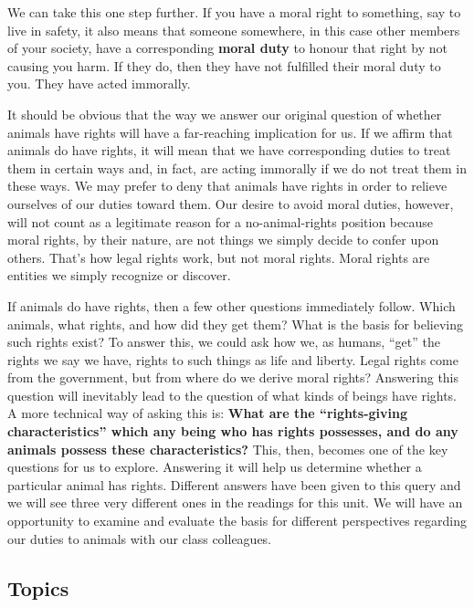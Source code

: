 \documentclass[
]{book}
\begin{document}
We can take this one step further. If you have a moral right to something, say to live in safety, it also means that someone somewhere, in this case other members of your society, have a corresponding \textbf{moral duty} to honour that right by not causing you harm. If they do, then they have not fulfilled their moral duty to you. They have acted immorally.

It should be obvious that the way we answer our original question of whether animals have rights will have a far-reaching implication for us. If we affirm that animals do have rights, it will mean that we have corresponding duties to treat them in certain ways and, in fact, are acting immorally if we do not treat them in these ways. We may prefer to deny that animals have rights in order to relieve ourselves of our duties toward them. Our desire to avoid moral duties, however, will not count as a legitimate reason for a no-animal-rights position because moral rights, by their nature, are not things we simply decide to confer upon others. That's how legal rights work, but not moral rights. Moral rights are entities we simply recognize or discover.

If animals do have rights, then a few other questions immediately follow. Which animals, what rights, and how did they get them? What is the basis for believing such rights exist? To answer this, we could ask how we, as humans, ``get'' the rights we say we have, rights to such things as life and liberty. Legal rights come from the government, but from where do we derive moral rights? Answering this question will inevitably lead to the question of what kinds of beings have rights. A more technical way of asking this is: \textbf{What are the ``rights-giving characteristics'' which any being who has rights possesses, and do any animals possess these characteristics?} This, then, becomes one of the key questions for us to explore. Answering it will help us determine whether a particular animal has rights. Different answers have been given to this query and we will see three very different ones in the readings for this unit. We will have an opportunity to examine and evaluate the basis for different perspectives regarding our duties to animals with our class colleagues.

\hypertarget{topics-4}{%
\subsection*{Topics}\label{topics-4}}
\end{document}
